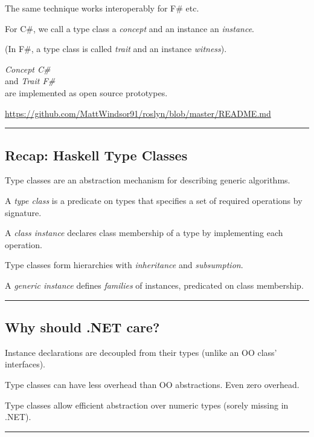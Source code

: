 The same technique works interoperably for F\# etc.

For C\#, we call a type class a \emph{concept} and an instance an
\emph{instance}.

(In F\#, a type class is called \emph{trait} and an instance
\emph{witness}).

\emph{Concept C\#}\\
and \emph{Trait F\#}\\
are implemented as open source prototypes.

\url{https://github.com/MattWindsor91/roslyn/blob/master/README.md}

\begin{center}\rule{0.5\linewidth}{\linethickness}\end{center}

\subsection{Recap: Haskell Type
Classes}\label{recap-haskell-type-classes}

Type classes are an abstraction mechanism for describing generic
algorithms.

A \emph{type class} is a predicate on types that specifies a set of
required operations by signature.

A \emph{class instance} declares class membership of a type by
implementing each operation.

Type classes form hierarchies with \emph{inheritance} and
\emph{subsumption}.

A \emph{generic instance} defines \emph{families} of instances,
predicated on class membership.

\begin{center}\rule{0.5\linewidth}{\linethickness}\end{center}

\subsection{Why should .NET care?}\label{why-should-.net-care}

Instance declarations are decoupled from their types (unlike an OO
class' interfaces).

Type classes can have less overhead than OO abstractions. Even zero
overhead.

Type classes allow efficient abstraction over numeric types (sorely
missing in .NET).

\begin{center}\rule{0.5\linewidth}{\linethickness}\end{center}

